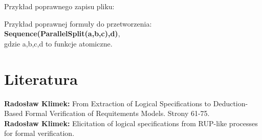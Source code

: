 \documentclass[a4paper, 11pt]{article}
\begin{document}
	
	Przykład poprawnego zapisu pliku:
	

	Przykład poprawnej formuły do przetworzenia:\\
	\textbf{Sequence(ParallelSplit(a,b,c),d)},\\
	gdzie a,b,c,d to funkcje atomiczne.	
	
	\section{Literatura}
	\textbf{Radosław Klimek:} From Extraction of Logical Specifications to Deduction-Based Formal Verification of Requitements Models. Strony 61-75.\\
		\textbf{Radosław Klimek:} Elicitation of logical specifications from RUP-like processes for formal verification.\\
	
	
	
\end{document}
